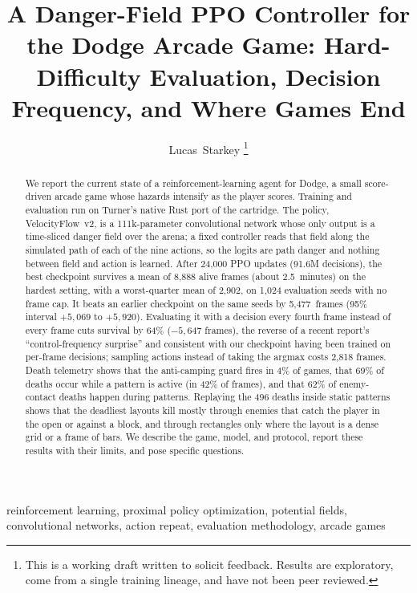 \documentclass[journal]{IEEEtran}
\begin{document}
\title{A Danger-Field PPO Controller for the Dodge Arcade Game: Hard-Difficulty
Evaluation, Decision Frequency, and Where Games End}

\author{Lucas~Starkey%
\thanks{This is a working draft written to solicit feedback. Results are
exploratory, come from a single training lineage, and have not been peer
reviewed.}}

\maketitle

\begin{abstract}
We report the current state of a reinforcement-learning agent for Dodge, a
small score-driven arcade game whose hazards intensify as the player scores.
Training and evaluation run on Turner's native Rust port of the cartridge.
The policy, VelocityFlow~v2, is a
111k-parameter convolutional network whose only output is a time-sliced danger
field over the arena; a fixed controller reads that field along the simulated
path of each of the nine actions, so the logits are path danger and nothing
between field and action is learned. After 24,000 PPO updates (91.6M
decisions), the best checkpoint survives a mean of 8,888 alive frames
(about 2.5~minutes) on the hardest setting, with a worst-quarter mean of 2,902,
on 1,024 evaluation seeds with no frame cap. It beats an earlier checkpoint on
the same seeds by 5,477~frames (95\% interval $+5{,}069$ to $+5{,}920$).
Evaluating it with a decision every fourth frame instead of every frame cuts
survival by 64\% ($-5{,}647$ frames), the reverse of a recent report's
``control-frequency surprise'' and consistent with our checkpoint having been
trained on per-frame decisions; sampling actions instead of taking the argmax
costs 2,818 frames. Death telemetry shows that the anti-camping guard fires in
4\% of games, that 69\% of deaths occur while a pattern is active (in 42\% of
frames), and that 62\% of enemy-contact deaths happen during patterns. Replaying the 496
deaths inside static patterns shows that the deadliest layouts kill mostly
through enemies that catch the player in the open or against a block, and
through rectangles only where the layout is a dense grid or a frame of bars. We
describe the game, model, and protocol, report these results with their
limits, and pose specific questions.
\end{abstract}

\begin{IEEEkeywords}
reinforcement learning, proximal policy optimization, potential fields,
convolutional networks, action repeat, evaluation methodology, arcade games
\end{IEEEkeywords}
\end{document}

